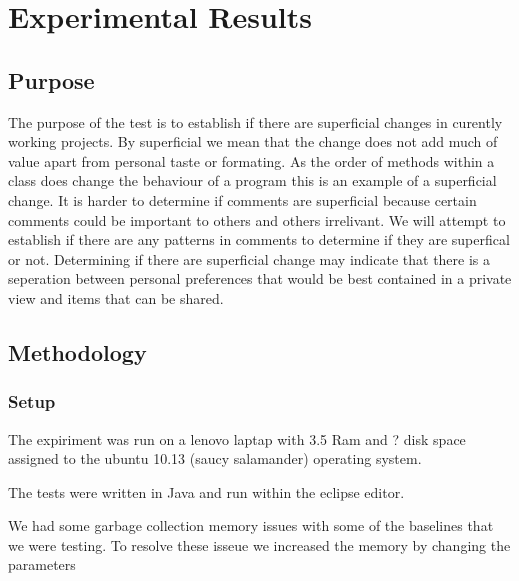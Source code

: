 
\chapter{Experimental Results}

\section{Purpose}
The purpose of the test is to establish if there are superficial changes in curently working projects.  By superficial we mean that the change does not add   much of value apart from personal taste or formating.  As the order of methods within a class does change the behaviour of a program this is an example of a superficial change.  It is harder to determine if comments are superficial because certain comments could be important to others and others irrelivant. We will attempt to establish if there are any patterns in comments to determine if they are superfical or not.  Determining if there are superficial change may indicate that there is a seperation between personal preferences that would be best contained in a private view and items that can be shared.    


\section{Methodology}


\subsection{Setup}
The expiriment was run on a lenovo laptap with 3.5 Ram and ? disk space assigned to the ubuntu 10.13 (saucy salamander) operating system.  

The tests were written in Java and run within the eclipse editor.

We had some garbage collection memory issues with some of the baselines that we were testing. To resolve these isseue we increased the memory by changing the parameters

